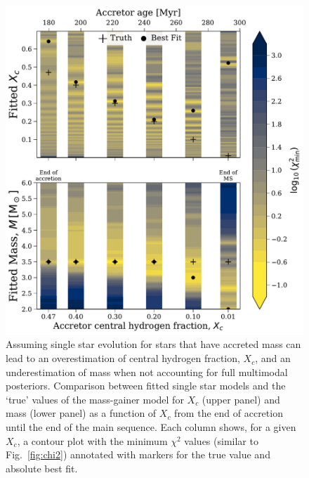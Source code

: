 \documentclass[twocolumn, twocolappendix, oneside]{aastex631}
\makeatletter
\newcommand{\unit}[1]{%
    \,\mathrm{#1}\checknextarg}
\newcommand{\checknextarg}{\@ifnextchar\bgroup{\gobblenextarg}{}}
\newcommand{\gobblenextarg}[1]{\,\mathrm{#1}\@ifnextchar\bgroup{\gobblenextarg}{}}
\newif\ifstartedinmathmode
\newcommand{\msun}{%
  \relax\ifmmode\startedinmathmodetrue\else\startedinmathmodefalse\fi
  {\ifstartedinmathmode\unit{M_{\odot}}\else$\unit{M_{\odot}}$\fi}\xspace%
}
\newif\ifstartedinmathmode
\makeatother
\begin{document}
\begin{figure}
    \centering
    \includegraphics[width=\columnwidth]{paper/figures/relative_estimates_psp.pdf}
    \caption{Assuming single star evolution for stars that have accreted mass can lead to an overestimation of central hydrogen fraction, $X_c$, and an underestimation of mass when not accounting for full multimodal posteriors. Comparison between fitted single star models and the `true' values of the mass-gainer model for $X_c$ (upper panel) and mass (lower panel) as a function of $X_c$ from the end of accretion until the end of the main sequence. Each column shows, for a given $X_c$, a contour plot with the minimum $\chi^2$ values (similar to Fig.~\ref{fig:chi2}) annotated with markers for the true value and absolute best fit.}
    \label{fig:relative_estimates_psp}
\end{figure}

\end{document}
